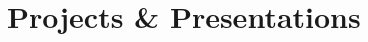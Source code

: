 \documentclass[letterpaper,10pt]{article} %
\begin{document}
\begin{tabular*}{\linewidth}{@{\extracolsep{\fill}} lr }
\end{tabular*}\vspace{-0.1in}\\

\section{Projects \& Presentations}
\end{document}
